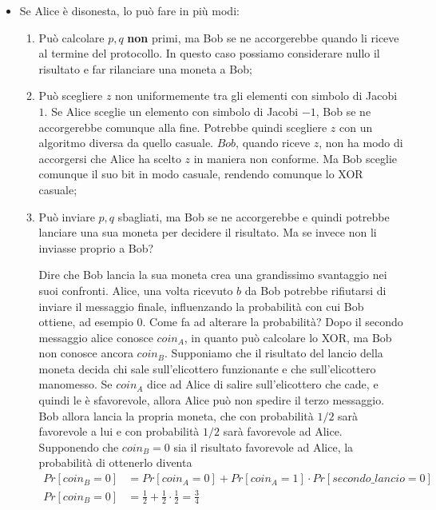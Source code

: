 \begin{itemize}
    \item Se Alice è disonesta, lo può fare in più modi:
    \begin{enumerate}
        \item Può calcolare $p, q$ \textbf{non} primi, ma Bob se ne accorgerebbe quando li riceve al termine del protocollo. In questo caso possiamo considerare nullo il risultato e far rilanciare una moneta a Bob;
        \item Può scegliere $z$ non uniformemente tra gli elementi con simbolo di Jacobi $1$. Se Alice sceglie un elemento con simbolo di Jacobi $-1$, Bob se ne accorgerebbe comunque alla fine. Potrebbe quindi scegliere $z$ con un algoritmo diversa da quello casuale. $Bob$, quando riceve $z$, non ha modo di accorgersi che Alice ha scelto $z$ in maniera non conforme. Ma Bob sceglie comunque il suo bit in modo casuale, rendendo comunque lo XOR casuale;
        \item Può inviare $p, q$ sbagliati, ma Bob se ne accorgerebbe e quindi potrebbe lanciare una sua moneta per decidere il risultato. Ma se invece non li inviasse proprio a Bob? 
        
        Dire che Bob lancia la sua moneta crea una grandissimo svantaggio nei suoi confronti. Alice, una volta ricevuto $b$ da Bob potrebbe rifiutarsi di inviare il messaggio finale, influenzando la probabilità con cui Bob ottiene, ad esempio $0$. Come fa ad alterare la probabilità? Dopo il secondo messaggio alice conosce $coin_A$, in quanto può calcolare lo XOR, ma Bob non conosce ancora $coin_B$.
        Supponiamo che il risultato del lancio della moneta decida chi sale sull'elicottero funzionante e che sull'elicottero manomesso. Se $coin_A$ dice ad Alice di salire sull'elicottero che cade, e quindi le è sfavorevole, allora Alice può non spedire il terzo messaggio. Bob allora lancia la propria moneta, che con probabilità $1/2$ sarà favorevole a lui e con probabilità $1/2$ sarà favorevole ad Alice. 
        Supponendo che $coin_B = 0$ sia il risultato favorevole ad Alice, la probabilità di ottenerlo diventa
        \begin{align*}
            Pr[coin_B = 0] &= Pr[coin_A = 0] + Pr[coin_A = 1] \cdot Pr[secondo\_lancio = 0]\\
            Pr[coin_B = 0] &= \frac{1}{2} + \frac{1}{2} \cdot \frac{1}{2} = \frac{3}{4}
        \end{align*}
    \end{enumerate}
\end{itemize}

